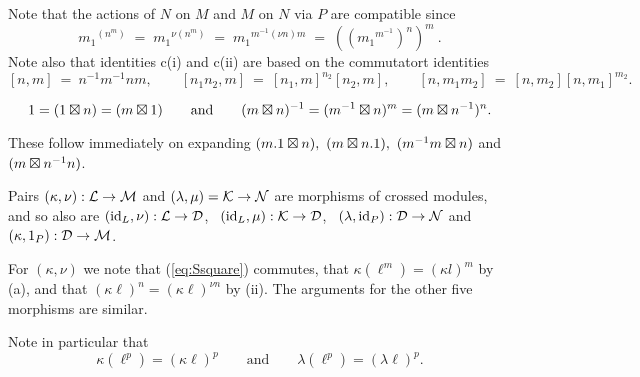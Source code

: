 Note that the actions of  $N$  on  $M$  and  $M$  
on  $N$  via  $P$
are compatible since
$$
{m_1}^{(n^m)} \;=\; {m_1}^{\nu(n^m)} \;=\; {m_1}^{m^{-1}(\nu n)m}
\;=\; (({m_1}^{m^{-1}})^n)^m~.
$$
Note also that identities c(i) and c(ii) are based on the commutatort identities 
$$
[n,m] ~=~ n^{-1}m^{-1}nm, \qquad 
[n_1n_2,m] ~=~ [n_1,m]^{n_2}[n_2,m], \qquad 
[n,m_1m_2] ~=~ [n,m_2][n,m_1]^{m_2} .
$$

\begin{lem} 
$$
1 = (1 \boxtimes n) = (m \boxtimes 1 ) 
\qquad\mbox{and}\qquad 
(m \boxtimes n )^{-1} = (m^{-1} \boxtimes n)^m = (m \boxtimes n^{-1})^n. 
$$
\end{lem}
\begin{pf}
These follow immediately on expanding 
$(m.1 \boxtimes n),\ (m \boxtimes n.1),\ (m^{-1}m \boxtimes n)$ and $(m \boxtimes n^{-1}n)$. 
\end{pf}

\begin{lem}
Pairs $(\kappa,\nu) : \mathcal{L} \to \mathcal{M}$ and  $(\lambda,\mu) = \mathcal{K} \to \mathcal{N}$ 
are morphisms of crossed modules, and so also are
$(\mathrm{id}_{L},\nu) : \mathcal{L} \to \mathcal{D}$,~ $(\mathrm{id}_{L},\mu) : \mathcal{K} \to \mathcal{D}$,~
$(\lambda,\mathrm{id}_{P}) : \mathcal{D} \to \mathcal{N}$  and  $(\kappa,1_{P}) : \mathcal{D} \to \mathcal{M}$.
\end{lem}
\begin{pf}
For $(\kappa,\nu)$ we note that (\ref{eq:Ssquare}) commutes,
that  $\kappa(\ell^m) = (\kappa l)^m$  by (a),
and that  $(\kappa \ell)^n = (\kappa \ell)^{\nu n}$  by (ii).
The arguments for the other five morphisms are similar.
\end{pf}

\medskip\noindent
Note in particular that
$$
\kappa(\ell^p) = (\kappa \ell)^p
\qquad \mbox{and} \qquad
\lambda(\ell^p) = (\lambda \ell)^p.
$$

